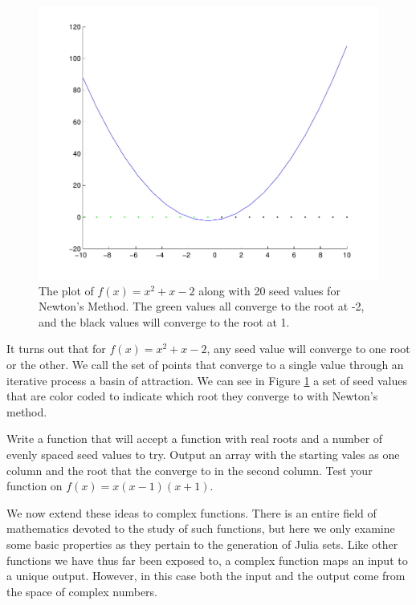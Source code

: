 \begin{figure}
\begin{center}
\includegraphics[scale=0.5]{basins1}
\caption{The plot of $f(x) = x^2 + x - 2$ along with 20 seed values for Newton's Method.
The green values all converge to the root at -2, and the black values will converge to the root at 1.}
\label{Fig:basins1}
\end{center}
\end{figure}

It turns out that for $f(x) = x^2 + x - 2$, any seed value will converge to one root or the other.
We call the set of points that converge to a single value through an iterative process a basin of attraction.
We can see in Figure \ref{Fig:basins1} a set of seed values that are color coded to indicate which root they converge to with Newton's method.

\begin{problem}
Write a function that will accept a function with real roots and a number of evenly spaced seed values to try.
Output an array with the starting vales as one column and the root that the converge to in the second column.
Test your function on $f(x) = x(x-1)(x+1)$.
\end{problem}

We now extend these ideas to complex functions.
There is an entire field of mathematics devoted to the study of such functions, but here we only examine some basic properties as they pertain to the generation of Julia sets.
Like other functions we have thus far been exposed to, a complex function maps an input to a unique output.
However, in this case both the input and the output come from the space of complex numbers.

